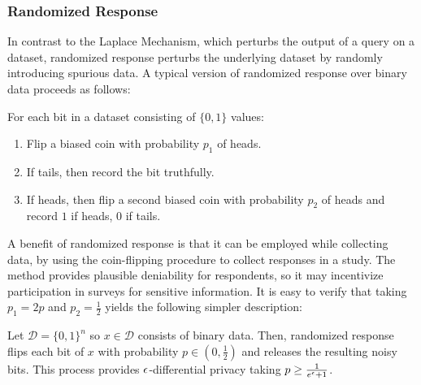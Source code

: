 
\subsubsection{Randomized Response}

In contrast to the Laplace Mechanism, which perturbs the output of a query on a dataset, randomized response perturbs the underlying dataset by randomly introducing spurious data. A typical version of randomized response over binary data proceeds as follows:


For each bit in a dataset consisting of $\{ 0,1 \}$ values:
\vspace{-0.2in}
\begin{enumerate}
	\item Flip a biased coin with probability $p_1$ of heads.
	\item If tails, then record the bit truthfully.
	\item If heads, then flip a second biased coin with probability $p_2$ of heads and record $1$ if heads, $0$ if tails.
\end{enumerate}

A benefit of randomized response is that it can be employed while collecting data, by using the coin-flipping procedure to collect responses in a study. The method provides plausible deniability for respondents, so it may incentivize participation in surveys for sensitive information.  It is easy to verify that taking $p_1 = 2p$ and $p_2 = \frac{1}{2}$ yields the following simpler description:

\begin{theorem}
	\label{thm:rr}
	Let $\mathcal{D} = \{0,1\}^n$ so $x \in \mathcal{D}$ consists of binary data. Then, randomized response flips each bit of $x$ with probability $p \in (0, \frac{1}{2})$ and releases the resulting noisy bits. This process provides $\epsilon$-differential privacy taking  $p \geq \frac{1}{e^\epsilon + 1}$.
\end{theorem}

